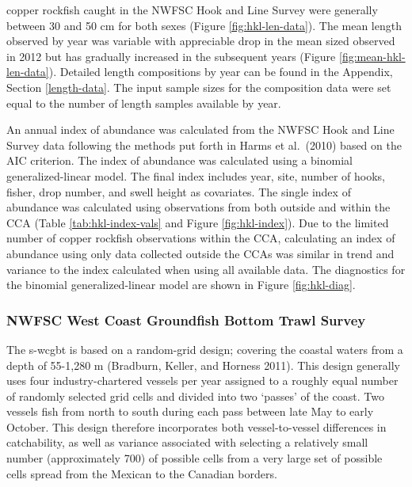 \documentclass[11pt,
  english,
  a4paper,
]{article}
\begin{document}
copper rockfish caught in the NWFSC Hook and Line Survey were generally between 30 and 50 cm for both sexes (Figure \ref{fig:hkl-len-data}). The mean length observed by year was variable with appreciable drop in the mean sized observed in 2012 but has gradually increased in the subsequent years (Figure \ref{fig:mean-hkl-len-data}). Detailed length compositions by year can be found in the Appendix, Section \ref{length-data}. The input sample sizes for the composition data were set equal to the number of length samples available by year.

\leavevmode\tagmcend\tagstructend\par


An annual index of abundance was calculated from the NWFSC Hook and Line Survey data following the methods put forth in Harms et al.~{(2010)\leavevmode\tagmcend\tagstructend} based on the AIC criterion. The index of abundance was calculated using a binomial generalized-linear model. The final index includes year, site, number of hooks, fisher, drop number, and swell height as covariates. The single index of abundance was calculated using observations from both outside and within the CCA (Table \ref{tab:hkl-index-vals} and Figure \ref{fig:hkl-index}). Due to the limited number of copper rockfish observations within the CCA, calculating an index of abundance using only data collected outside the CCAs was similar in trend and variance to the index calculated when using all available data. The diagnostics for the binomial generalized-linear model are shown in Figure \ref{fig:hkl-diag}.

\leavevmode\tagmcend\tagstructend\par


\hypertarget{nwfsc-west-coast-groundfish-bottom-trawl-survey}{%
\subsubsection{NWFSC West Coast Groundfish Bottom Trawl Survey}\label{nwfsc-west-coast-groundfish-bottom-trawl-survey}}

\leavevmode\tagmcend\tagstructend


The \gls{s-wcgbt} is based on a random-grid design; covering the coastal waters from a depth of 55-1,280 m {(Bradburn, Keller, and Horness 2011)\leavevmode\tagmcend\tagstructend}. This design generally uses four industry-chartered vessels per year assigned to a roughly equal number of randomly selected grid cells and divided into two `passes' of the coast. Two vessels fish from north to south during each pass between late May to early October. This design therefore incorporates both vessel-to-vessel differences in catchability, as well as variance associated with selecting a relatively small number (approximately 700) of possible cells from a very large set of possible cells spread from the Mexican to the Canadian borders.
\end{document}

